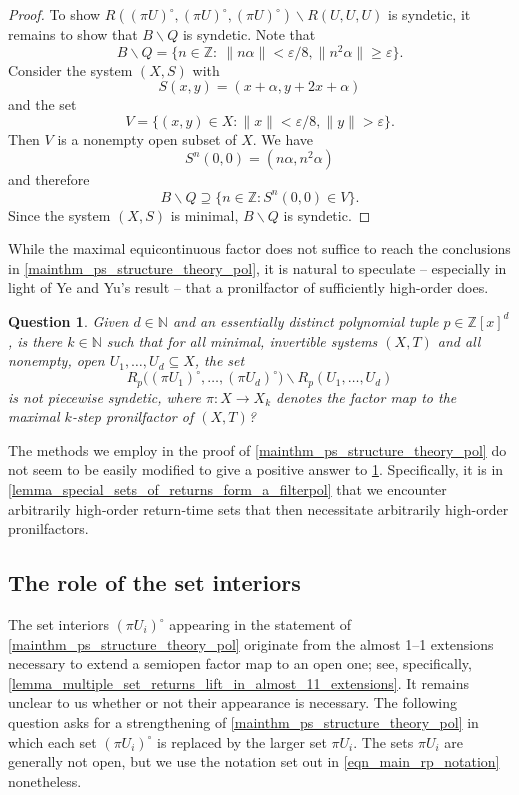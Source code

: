 \documentclass{article}
\theoremstyle{plain}
\newtheorem{question}[Theorem]{Question}
\theoremstyle{claim}
\theoremstyle{definition}
\theoremstyle{plain}
\theoremstyle{plain}
\newcommand{\N}{\mathbb{N}}
\newcommand{\Z}{\mathbb{Z}}
\renewcommand{\epsilon}{\varepsilon}
\renewcommand{\geq}{\geqslant}
\renewcommand{\setminus}{\backslash}
\newcommand{\1}{\boldsymbol{1}}
\begin{document}
\begin{proof}
To show $R((\pi U)^\circ, (\pi U)^\circ, (\pi U)^\circ) \setminus R(U, U, U)$ is syndetic, it remains to show that $B \setminus Q$ is syndetic. Note that 
\[
    B \setminus Q = \{n \in \Z: \ \lVert n \alpha \rVert < \epsilon/8, \lVert n^2 \alpha \rVert \geq \epsilon\}.
\]
Consider the system $(X, S)$ with 
\[
    S(x, y) = (x + \alpha, y + 2x + \alpha)
\]
and the set
\[
    V = \{(x, y) \in X: \lVert x \rVert < \epsilon/8, \lVert y \rVert > \epsilon\}.
\]
Then $V$ is a nonempty open subset of $X$. We have
\[
    S^n(0, 0) = (n \alpha, n^2 \alpha)
\]
and therefore
\[
    B \setminus Q \supseteq \{n \in \Z: S^n (0, 0) \in V\}.
\]
Since the system $(X, S)$ is minimal, $B \setminus Q$ is syndetic. 
\end{proof}


While the maximal equicontinuous factor does not suffice to reach the conclusions in \cref{mainthm_ps_structure_theory_pol}, it is natural to speculate -- especially in light of Ye and Yu's result \cite[Theorem~A]{yeyu} -- that a pronilfactor of sufficiently high-order does.

\begin{question}
\label{quest_suff_high_order_factor_suffices}
    Given $d \in \N$ and an essentially distinct polynomial tuple $p \in \Z[x]^d$, is there $k \in \N$ such that for all minimal, invertible systems $(X,T)$ and all nonempty, open $U_1, \ldots, U_d \subseteq X$, the set
    \[
        R_p\big((\pi U_1)^\circ, \ldots, (\pi U_d)^\circ\big) \setminus R_p(U_1, \ldots, U_d)
    \]
    is not piecewise syndetic, where $\pi: X \to X_k$ denotes the factor map to the maximal $k$-step pronilfactor of $(X,T)$?
\end{question}

The methods we employ in the proof of \cref{mainthm_ps_structure_theory_pol} do not seem to be easily modified to give a positive answer to \cref{quest_suff_high_order_factor_suffices}.  Specifically, it is in \cref{lemma_special_sets_of_returns_form_a_filterpol} that we encounter arbitrarily high-order return-time sets that then necessitate arbitrarily high-order pronilfactors.

\subsection{The role of the set interiors}
\label{sec_interiors_role}

The set interiors $(\pi U_i)^\circ$ appearing in the statement of \cref{mainthm_ps_structure_theory_pol} originate from the almost 1--1 extensions necessary to extend a semiopen factor map to an open one; see, specifically, \cref{lemma_multiple_set_returns_lift_in_almost_11_extensions}.  It remains unclear to us whether or not their appearance is necessary. The following question asks for a strengthening of \cref{mainthm_ps_structure_theory_pol} in which each set $(\pi U_i)^\circ$ is replaced by the larger set $\pi U_i$.  The sets $\pi U_i$ are generally not open, but we use the notation set out in \eqref{eqn_main_rp_notation} nonetheless.
\end{document}
